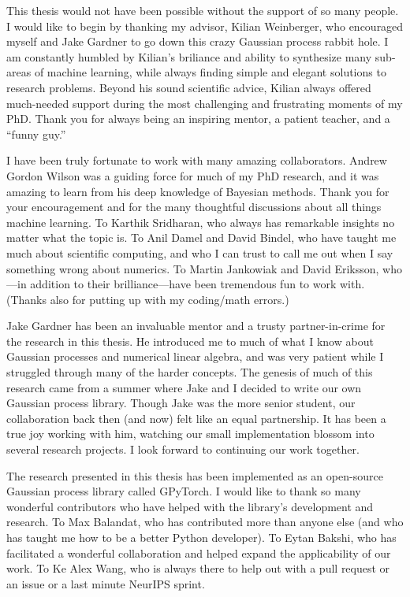 This thesis would not have been possible without the support of so many people.
I would like to begin by thanking my advisor, Kilian Weinberger, who encouraged myself and Jake Gardner to go down this crazy Gaussian process rabbit hole.
I am constantly humbled by Kilian's briliance and ability to synthesize many sub-areas of machine learning, while always finding simple and elegant solutions to research problems.
Beyond his sound scientific advice, Kilian always offered much-needed support during the most challenging and frustrating moments of my PhD.
Thank you for always being an inspiring mentor, a patient teacher, and a ``funny guy.''

I have been truly fortunate to work with many amazing collaborators.
Andrew Gordon Wilson was a guiding force for much of my PhD research, and it was amazing to learn from his deep knowledge of Bayesian methods.
Thank you for your encouragement and for the many thoughtful discussions about all things machine learning.
To Karthik Sridharan, who always has remarkable insights no matter what the topic is.
To Anil Damel and David Bindel, who have taught me much about scientific computing, and who I can trust to call me out when I say something wrong about numerics.
To Martin Jankowiak and David Eriksson, who---in addition to their brilliance---have been tremendous fun to work with.
(Thanks also for putting up with my coding/math errors.)

Jake Gardner has been an invaluable mentor and a trusty partner-in-crime for the research in this thesis.
He introduced me to much of what I know about Gaussian processes and numerical linear algebra, and was very patient while I struggled through many of the harder concepts.
The genesis of much of this research came from a summer where Jake and I decided to write our own Gaussian process library.
Though Jake was the more senior student, our collaboration back then (and now) felt like an equal partnership.
It has been a true joy working with him, watching our small implementation blossom into several research projects.
I look forward to continuing our work together.

The research presented in this thesis has been implemented as an open-source Gaussian process library called GPyTorch.
I would like to thank so many wonderful contributors who have helped with the library's development and research.
To Max Balandat, who has contributed more than anyone else (and who has taught me how to be a better Python developer).
To Eytan Bakshi, who has facilitated a wonderful collaboration and helped expand the applicability of our work.
To Ke Alex Wang, who is always there to help out with a pull request or an issue or a last minute NeurIPS sprint.

